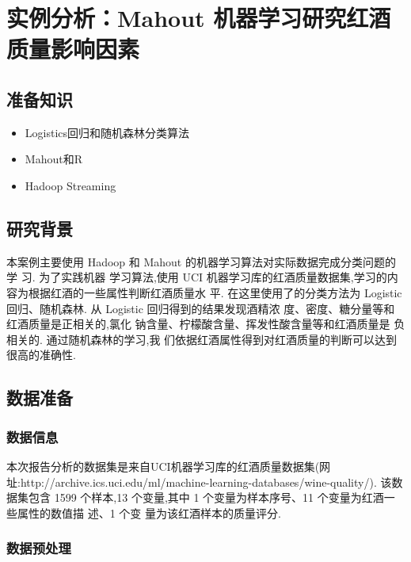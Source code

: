 \section{实例分析：Mahout
机器学习研究红酒质量影响因素}\label{ux5b9eux4f8bux5206ux6790mahout-ux673aux5668ux5b66ux4e60ux7814ux7a76ux7ea2ux9152ux8d28ux91cfux5f71ux54cdux56e0ux7d20}

\subsection{准备知识}\label{ux51c6ux5907ux77e5ux8bc6}

\begin{itemize}
\itemsep1pt\parskip0pt
\item
  Logistics回归和随机森林分类算法
\item
  Mahout和R
\item
  Hadoop Streaming
\end{itemize}

\subsection{研究背景}\label{ux7814ux7a76ux80ccux666f}

本案例主要使用 Hadoop 和 Mahout 的机器学习算法对实际数据完成分类问题的学
习. 为了实践机器 学习算法,使用 UCI
机器学习库的红酒质量数据集,学习的内容为根据红酒的一些属性判断红酒质量水
平. 在这里使用了的分类方法为 Logistic 回归、随机森林. 从 Logistic
回归得到的结果发现酒精浓 度、密度、糖分量等和红酒质量是正相关的,氯化
钠含量、柠檬酸含量、挥发性酸含量等和红酒质量是 负相关的.
通过随机森林的学习,我
们依据红酒属性得到对红酒质量的判断可以达到很高的准确性.

\subsection{数据准备}\label{ux6570ux636eux51c6ux5907}

\subsubsection{数据信息}\label{ux6570ux636eux4fe1ux606f}

本次报告分析的数据集是来自UCI机器学习库的红酒质量数据集(网
址:http://archive.ics.uci.edu/ml/machine-learning-databases/wine-quality/).
该数据集包含 1599 个样本,13 个变量,其中 1 个变量为样本序号、11
个变量为红酒一些属性的数值描 述、1 个变 量为该红酒样本的质量评分.

\subsubsection{数据预处理}\label{ux6570ux636eux9884ux5904ux7406}

